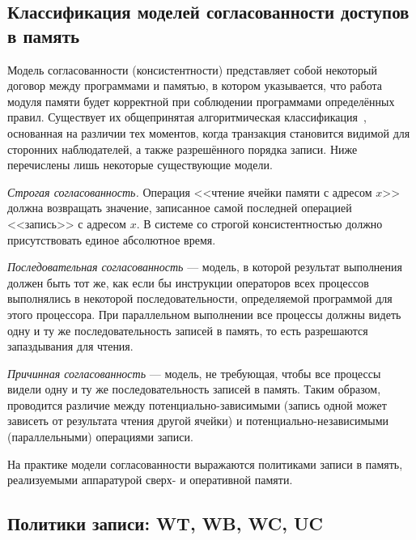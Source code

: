 \subsection[Классификация моделей согласованности]{Классификация моделей согласованности доступов в память}


Модель согласованности (консистентности) представляет собой некоторый договор между программами и памятью, в котором указывается, что работа модуля памяти будет корректной при соблюдении программами определённых правил. Существует их общепринятая алгоритмическая классификация~\cite{Mosberger93memoryconsistency}, основанная на различии тех моментов, когда транзакция становится видимой для сторонних наблюдателей, а также разрешённого порядка записи. Ниже перечислены лишь некоторые существующие модели.

\begin{enumerate*}
\item    \textit{Строгая согласованность.} Операция <<чтение ячейки памяти с адресом $x$>> должна возвращать значение, записанное самой последней операцией <<запись>> с адресом $x$. В системе со строгой консистентностью должно присутствовать единое абсолютное время.

\item    \textit{Последовательная согласованность} --- модель, в которой результат выполнения должен быть тот же, как если бы инструкции операторов всех процессов выполнялись в некоторой последовательности, определяемой программой для этого процессора. При параллельном выполнении все процессы должны видеть одну и ту же последовательность записей в память, то есть разрешаются запаздывания для чтения.

\item    \textit{Причинная согласованность} --- модель, не требующая, чтобы все процессы видели одну и ту же последовательность записей в память. Таким образом, проводится различие между потенциально-зависимыми (запись одной может зависеть от результата чтения другой ячейки) и потенциально-независимыми (параллельными) операциями записи.

\end{enumerate*}

На практике модели согласованности выражаются политиками записи в память, реализуемыми аппаратурой сверх- и оперативной памяти.

\subsection[Политики записи]{Политики записи: WT, WB, WC, UC}

